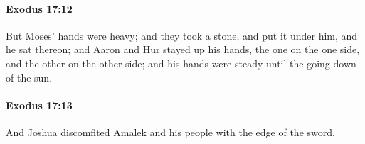 		\paragraph{Exodus 17:12} %
			\label{EXODUS-17-12}

			But Moses' hands were heavy; and they took a stone, and put it under him, and he sat thereon; and Aaron and Hur stayed up his hands, the one on the one side, and the other on the other side; and his hands were steady until the going down of the sun.


		\paragraph{Exodus 17:13} %
			\label{EXODUS-17-13}

			And Joshua discomfited Amalek and his people with the edge of the sword.


